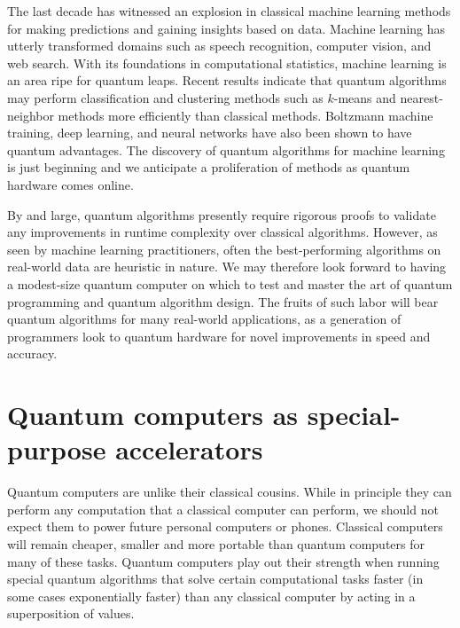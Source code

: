 \documentclass[journal]{IEEEtran}
\begin{document}
The last decade has witnessed an explosion in classical machine learning methods for making predictions and gaining insights based on data.  Machine learning has utterly transformed domains such as speech recognition, computer vision, and web search.  With its foundations in computational statistics, machine learning is an area ripe for quantum leaps.  Recent results indicate that quantum algorithms may perform classification and clustering methods such as $k$-means and nearest-neighbor methods more efficiently than  classical methods.  Boltzmann machine training, deep learning, and neural networks have also been shown to have quantum advantages.  The discovery of quantum algorithms for machine learning is just beginning and we anticipate a proliferation of methods as quantum hardware comes online.  

By and large, quantum algorithms presently require rigorous proofs to validate any improvements in runtime complexity over classical algorithms.  However, as seen by machine learning practitioners, often the best-performing algorithms on real-world data are heuristic in nature.  We may therefore look forward to having a modest-size quantum computer on which to test and master the art of quantum programming and quantum algorithm design.  The fruits of such labor will bear quantum algorithms for many real-world applications, as a generation of programmers look to quantum hardware for novel improvements in speed and accuracy.


\section{Quantum computers as special-purpose accelerators }


Quantum computers are unlike their classical cousins.  While in principle they can perform any computation that a classical computer can perform, we should not expect them to power future personal computers or phones. Classical computers will remain cheaper, smaller and more portable than quantum computers for many of these tasks. Quantum computers play out their strength when running special quantum algorithms that solve certain computational tasks faster (in some cases exponentially faster) than any classical computer by acting in a superposition of values.  
\end{document}
